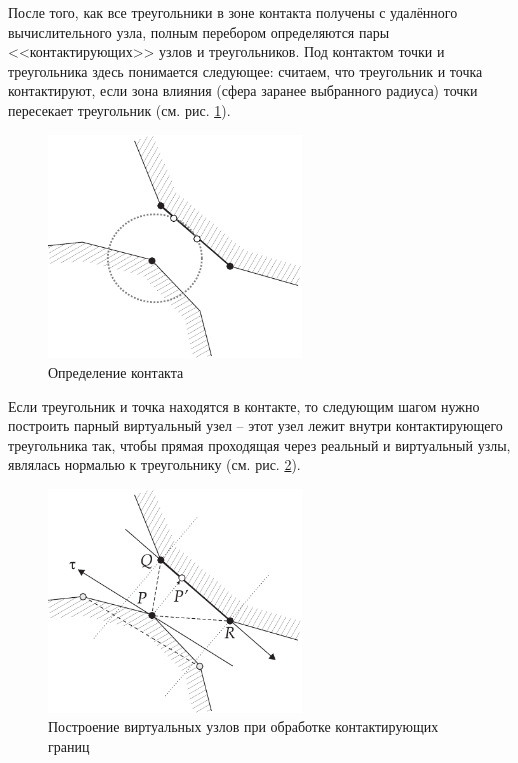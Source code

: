 После того, как все треугольники в зоне контакта получены с удалённого вычислительного узла, полным перебором определяются пары <<контактирующих>> узлов и треугольников. Под контактом точки и треугольника здесь понимается следующее: считаем, что треугольник и точка контактируют, если зона влияния (сфера заранее выбранного радиуса) точки пересекает треугольник (см. рис. \ref{pic:contact_detection}).
\begin{figure}[htp]
\centering
\includegraphics[width=0.6\textwidth]{pdf/contact_detection.pdf}
\caption{Определение контакта}
\label{pic:contact_detection}
\end{figure}
Если треугольник и точка находятся в контакте, то следующим шагом нужно построить парный виртуальный узел -- этот узел лежит внутри контактирующего треугольника так, чтобы прямая проходящая через реальный и виртуальный узлы, являлась нормалью к треугольнику (см. рис. \ref{pic:contact_processing}).
\begin{figure}[htp]
\centering
\includegraphics[width=0.6\textwidth]{pdf/contact_processing.pdf}
\caption{Построение виртуальных узлов при обработке контактирующих границ}
\label{pic:contact_processing}
\end{figure}
